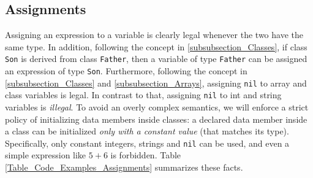\documentclass{article}
\begin{document}
\subsection{Assignments}
\label{subsection_Assignments}
Assigning an expression to a variable is clearly legal whenever the two have the same type.
In addition, following the concept in \ref{subsubsection_Classes},
if class \verb"Son" is derived from class \verb"Father",
then a variable of type \verb"Father" can be assigned an expression
of type \verb"Son".
Furthermore, following the concept in \ref{subsubsection_Classes} and \ref{subsubsection_Arrays},
assigning \verb"nil" to array and class variables is legal.
In contrast to that, assigning \verb"nil" to int and string variables is \textit{illegal}.
To avoid an overly complex semantics,
we will enforce a strict policy of initializing data members inside classes:
a declared data member inside a class can be initialized \textit{only with a constant value}
(that matches its type). Specifically, only constant integers, strings and \verb"nil"
can be used, and even a simple expression like $5+6$ is forbidden.
Table \ref{Table_Code_Examples_Assignments} summarizes these facts.
\end{document}

